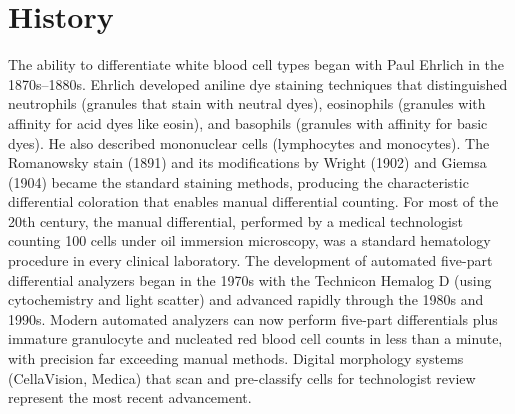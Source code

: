 \section*{History}
The ability to differentiate white blood cell types began with Paul Ehrlich in the 1870s--1880s. Ehrlich developed aniline dye staining techniques that distinguished neutrophils (granules that stain with neutral dyes), eosinophils (granules with affinity for acid dyes like eosin), and basophils (granules with affinity for basic dyes). He also described mononuclear cells (lymphocytes and monocytes). The Romanowsky stain (1891) and its modifications by Wright (1902) and Giemsa (1904) became the standard staining methods, producing the characteristic differential coloration that enables manual differential counting. For most of the 20th century, the manual differential, performed by a medical technologist counting 100 cells under oil immersion microscopy, was a standard hematology procedure in every clinical laboratory. The development of automated five-part differential analyzers began in the 1970s with the Technicon Hemalog D (using cytochemistry and light scatter) and advanced rapidly through the 1980s and 1990s. Modern automated analyzers can now perform five-part differentials plus immature granulocyte and nucleated red blood cell counts in less than a minute, with precision far exceeding manual methods. Digital morphology systems (CellaVision, Medica) that scan and pre-classify cells for technologist review represent the most recent advancement.

